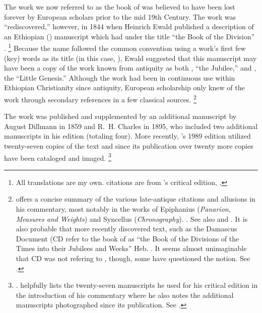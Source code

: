 
\nocite{dillamnn_jbw_kleine}
\nocite{ewald_zkm1844}


The work we now referred to as the book of \jub was believed to have been lost forever by European scholars prior to the mid 19th Century. The work was ``rediscovered,'' however, in 1844 when Heinrich Ewald published a description of an Ethiopian (\geez) manuscript which had under the title ``the Book of the Division'' .%
        \footnote{All translations are my own. \geez citations are from \vanderkam's critical edition, \cite*{vanderkam1989}.}
Because the name followed the common convention using a work's first few (key) words as its title (in this case, ), Ewald suggested that this manuscript may have been a copy of the work known from antiquity as both , ``the Jubilee,'' and , the ``Little Genesis.''\autocite[176--179]{ewald_zkm1844} Although the work had been in continuous use within Ethiopian Christianity since antiquity, European scholarship only knew of the work through secondary references in a few classical sources.%
        \footnote{\vanderkam offers a concise summary of the various late-antique citations and allusions in his commentary, most notably in the works of Epiphanius (\emph{Panarion}, \emph{Measures and Weights}) and Syncellus (\emph{Chronography}).
                \cite[1:10--14]{vanderkam2018}. See also 
                \cite{reed_kister-etal2015} and 
                \cite{kreps_ch2018}.
        It is also probable that more recently discovered text, such as the Damascus Document (CD refer to the book of \jub as 
        ``the Book of the Divisions of the Times into their Jubilees and Weeks'' Heb. . It seems almost unimaginable that CD was not refering to \jub, though, some have questioned the notion. See \cite[242--248]{dimant_vanderkam-etal2006}.}

The work was published and supplemented by an additional manuscript by August Dillmann in 1859\autocite{dillmann1859} and R.~H. Charles in 1895, who included two additional manuscripts in his edition (totaling four).\autocite{charles1895} More recently, \vanderkam's 1989 edition utilized twenty-seven copies of the text\autocite[1:xiv--xvi]{vanderkam1989} and since its publication over twenty more copies have been cataloged and imaged.%
        \footnote{%
                \cite{erho_bsoas2013}.
                \vanderkam helpfully lists the twenty-seven manuscripts he used for his critical edition in the introduction of his commentary where he also notes the additional manuscripts photographed since its publication. See 
                \cite[1:14--16]{vanderkam2018}.}

